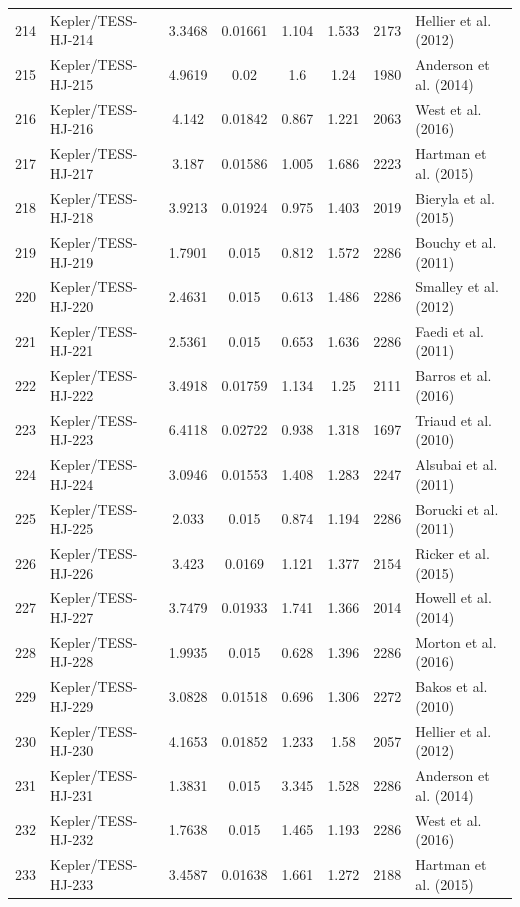 \begin{longtable}{r l c c c c c p{4.2cm}}
214 & Kepler/TESS-HJ-214 & 3.3468 & 0.01661 & 1.104 & 1.533 & 2173 & Hellier et al. (2012) \\
215 & Kepler/TESS-HJ-215 & 4.9619 & 0.02 & 1.6 & 1.24 & 1980 & Anderson et al. (2014) \\
216 & Kepler/TESS-HJ-216 & 4.142 & 0.01842 & 0.867 & 1.221 & 2063 & West et al. (2016) \\
217 & Kepler/TESS-HJ-217 & 3.187 & 0.01586 & 1.005 & 1.686 & 2223 & Hartman et al. (2015) \\
218 & Kepler/TESS-HJ-218 & 3.9213 & 0.01924 & 0.975 & 1.403 & 2019 & Bieryla et al. (2015) \\
219 & Kepler/TESS-HJ-219 & 1.7901 & 0.015 & 0.812 & 1.572 & 2286 & Bouchy et al. (2011) \\
220 & Kepler/TESS-HJ-220 & 2.4631 & 0.015 & 0.613 & 1.486 & 2286 & Smalley et al. (2012) \\
221 & Kepler/TESS-HJ-221 & 2.5361 & 0.015 & 0.653 & 1.636 & 2286 & Faedi et al. (2011) \\
222 & Kepler/TESS-HJ-222 & 3.4918 & 0.01759 & 1.134 & 1.25 & 2111 & Barros et al. (2016) \\
223 & Kepler/TESS-HJ-223 & 6.4118 & 0.02722 & 0.938 & 1.318 & 1697 & Triaud et al. (2010) \\
224 & Kepler/TESS-HJ-224 & 3.0946 & 0.01553 & 1.408 & 1.283 & 2247 & Alsubai et al. (2011) \\
225 & Kepler/TESS-HJ-225 & 2.033 & 0.015 & 0.874 & 1.194 & 2286 & Borucki et al. (2011) \\
226 & Kepler/TESS-HJ-226 & 3.423 & 0.0169 & 1.121 & 1.377 & 2154 & Ricker et al. (2015) \\
227 & Kepler/TESS-HJ-227 & 3.7479 & 0.01933 & 1.741 & 1.366 & 2014 & Howell et al. (2014) \\
228 & Kepler/TESS-HJ-228 & 1.9935 & 0.015 & 0.628 & 1.396 & 2286 & Morton et al. (2016) \\
229 & Kepler/TESS-HJ-229 & 3.0828 & 0.01518 & 0.696 & 1.306 & 2272 & Bakos et al. (2010) \\
230 & Kepler/TESS-HJ-230 & 4.1653 & 0.01852 & 1.233 & 1.58 & 2057 & Hellier et al. (2012) \\
231 & Kepler/TESS-HJ-231 & 1.3831 & 0.015 & 3.345 & 1.528 & 2286 & Anderson et al. (2014) \\
232 & Kepler/TESS-HJ-232 & 1.7638 & 0.015 & 1.465 & 1.193 & 2286 & West et al. (2016) \\
233 & Kepler/TESS-HJ-233 & 3.4587 & 0.01638 & 1.661 & 1.272 & 2188 & Hartman et al. (2015) \\

\end{longtable}
